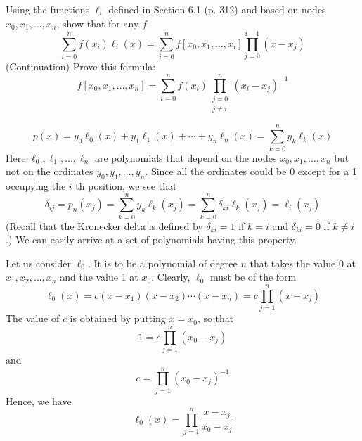 Using the functions $\ell_i$ defined in Section 6.1 (p. 312) and based on nodes $x_0, x_1, \ldots, x_n$, show that for any $f$
$$
\sum_{i=0}^{\dot{n}} f\left(x_i\right) \ell_i(x)=\sum_{i=0}^n f\left[x_0, x_1, \ldots, x_i\right] \prod_{j=0}^{i-1}\left(x-x_j\right)
$$
(Continuation) Prove this formula:
$$
f\left[x_0, x_1, \ldots, x_n\right]=\sum_{i=0}^n f\left(x_i\right) \prod_{\substack{j=0 \\ j \neq i}}^n\left(x_i-x_j\right)^{-1}
$$

$$
p(x)=y_0 \ell_0(x)+y_1 \ell_1(x)+\cdots+y_n \ell_n(x)=\sum_{k=0}^n y_k \ell_k(x)
$$
Here $\ell_0, \ell_1, \ldots, \ell_n$ are polynomials that depend on the nodes $x_0, x_1, \ldots, x_n$ but not on the ordinates $y_0, y_1, \ldots, y_n$. Since all the ordinates could be 0 except for a 1 occupying the $i$ th position, we see that
$$
\delta_{i j}=p_n\left(x_j\right)=\sum_{k=0}^n y_k \ell_k\left(x_j\right)=\sum_{k=0}^n \delta_{k i} \ell_k\left(x_j\right)=\ell_i\left(x_j\right)
$$
(Recall that the Kronecker delta is defined by $\delta_{k i}=1$ if $k=i$ and $\delta_{k i}=0$ if $k \neq i$.) We can easily arrive at a set of polynomials having this property.

Let us consider $\ell_0$. It is to be a polynomial of degree $n$ that takes the value 0 at $x_1, x_2, \ldots, x_n$ and the value 1 at $x_0$. Clearly, $\ell_0$ must be of the form
$$
\ell_0(x)=c\left(x-x_1\right)\left(x-x_2\right) \cdots\left(x-x_n\right)=c \prod_{j=1}^n\left(x-x_j\right)
$$
The value of $c$ is obtained by putting $x=x_0$, so that
$$
1=c \prod_{j=1}^n\left(x_0-x_j\right)
$$
and
$$
c=\prod_{j=1}^n\left(x_0-x_j\right)^{-1}
$$
Hence, we have
$$
\ell_0(x)=\prod_{j=1}^n \frac{x-x_j}{x_0-x_j}
$$